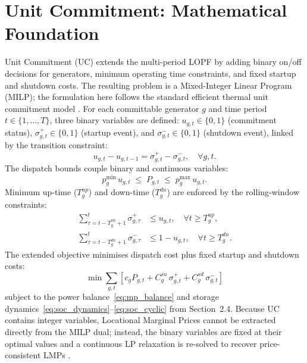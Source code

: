 \section{Unit Commitment: Mathematical Foundation}
\label{sec:uc_math}

Unit Commitment (UC) extends the multi-period LOPF by adding binary on/off decisions for generators, minimum operating time constraints, and fixed startup and shutdown costs. The resulting problem is a Mixed-Integer Linear Program (MILP); the formulation here follows the standard efficient thermal unit commitment model \cite{carrion2006uc}. For each committable generator $g$ and time period $t \in \{1,\ldots,T\}$, three binary variables are defined: $u_{g,t} \in \{0,1\}$ (commitment status), $\sigma_{g,t}^+ \in \{0,1\}$ (startup event), and $\sigma_{g,t}^- \in \{0,1\}$ (shutdown event), linked by the transition constraint:
\begin{equation}
    u_{g,t} - u_{g,t-1} = \sigma_{g,t}^+ - \sigma_{g,t}^-, \quad \forall g,t.
    \label{eq:uc_logic}
\end{equation}
The dispatch bounds couple binary and continuous variables:
\begin{equation}
    p_g^\text{min}\,u_{g,t} \;\leq\; P_{g,t} \;\leq\; p_g^\text{max}\,u_{g,t}.
    \label{eq:uc_bounds}
\end{equation}
Minimum up-time ($T_g^{up}$) and down-time ($T_g^{dn}$) are enforced by the rolling-window constraints:
\begin{align}
    \sum_{\tau=t-T_g^{up}+1}^{t} \sigma_{g,\tau}^+ &\leq u_{g,t}, \quad \forall t \geq T_g^{up},
    \label{eq:minup} \\
    \sum_{\tau=t-T_g^{dn}+1}^{t} \sigma_{g,\tau}^- &\leq 1 - u_{g,t}, \quad \forall t \geq T_g^{dn}.
    \label{eq:mindn}
\end{align}
The extended objective minimises dispatch cost plus fixed startup and shutdown costs:
\begin{equation}
    \min \sum_{g,t} \!\left[ c_g P_{g,t} + C_g^{su}\,\sigma_{g,t}^+ + C_g^{sd}\,\sigma_{g,t}^- \right]
    \label{eq:uc_obj_ch2}
\end{equation}
subject to the power balance~\eqref{eq:mp_balance} and storage dynamics~\eqref{eq:soc_dynamics}--\eqref{eq:soc_cyclic} from Section~2.4. Because UC contains integer variables, Locational Marginal Prices cannot be extracted directly from the MILP dual; instead, the binary variables are fixed at their optimal values and a continuous LP relaxation is re-solved to recover price-consistent LMPs \cite{oneill2005}.

